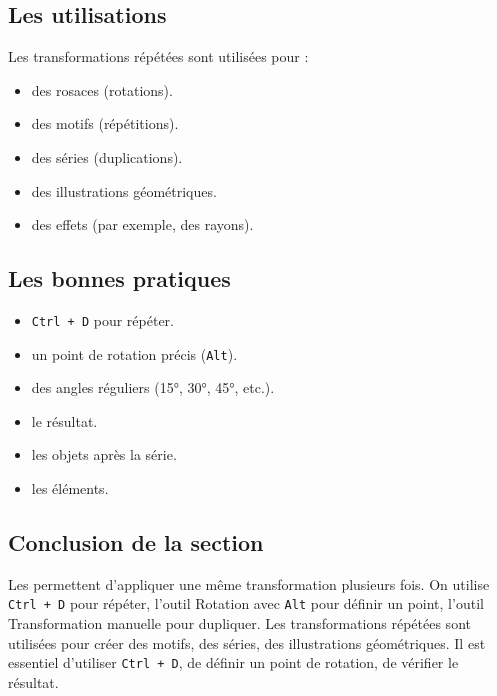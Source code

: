 \subsection{Les utilisations}

Les transformations répétées sont utilisées pour :

\begin{itemize}
    \item {} des rosaces (rotations).
    \item {} des motifs (répétitions).
    \item {} des séries (duplications).
    \item {} des illustrations géométriques.
    \item {} des effets (par exemple, des rayons).
\end{itemize}

\subsection{Les bonnes pratiques}

\begin{itemize}
    \item {} \texttt{Ctrl + D} pour répéter.
    \item {} un point de rotation précis (\texttt{Alt}).
    \item {} des angles réguliers (15°, 30°, 45°, etc.).
    \item {} le résultat.
    \item {} les objets après la série.
    \item {} les éléments.
\end{itemize}

\subsection*{Conclusion de la section}

Les  permettent d'appliquer une même transformation plusieurs fois. On utilise \texttt{Ctrl + D} pour répéter, l'outil Rotation avec \texttt{Alt} pour définir un point, l'outil Transformation manuelle pour dupliquer. Les transformations répétées sont utilisées pour créer des motifs, des séries, des illustrations géométriques. Il est essentiel d'utiliser \texttt{Ctrl + D}, de définir un point de rotation, de vérifier le résultat.

